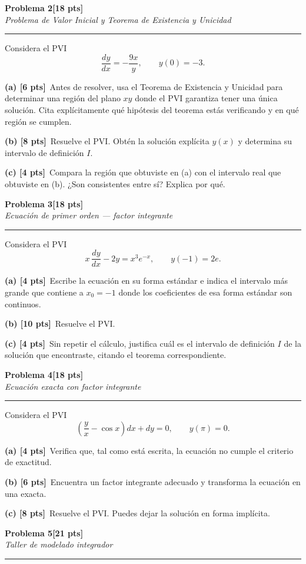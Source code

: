 \documentclass[11pt,letterpaper]{article}
\newcommand{\problema}[3]{%
  \bigskip\bigskip\noindent
  {\Large\textbf{Problema #1}}\hfill\textbf{[#2 pts]}\\[3pt]
  {\small\itshape #3}\par
  \vspace{2pt}\hrule\vspace{8pt}
}
\newcommand{\subparte}[2]{%
  \medskip\noindent\textbf{(#1}\ #2\par
}
\begin{document}
\problema{2}{18}{Problema de Valor Inicial y Teorema de Existencia y Unicidad}

Considera el PVI
\[
\frac{dy}{dx} = -\frac{9x}{y}, \qquad y(0) = -3.
\]

\subparte{a) [6 pts]}{Antes de resolver, usa el Teorema de Existencia y Unicidad para determinar una región del plano $xy$ donde el PVI garantiza tener una única solución. Cita explícitamente qué hipótesis del teorema estás verificando y en qué región se cumplen.}

\subparte{b) [8 pts]}{Resuelve el PVI. Obtén la solución explícita $y(x)$ y determina su intervalo de definición $I$.}

\subparte{c) [4 pts]}{Compara la región que obtuviste en (a) con el intervalo real que obtuviste en (b). ¿Son consistentes entre sí? Explica por qué.}


\problema{3}{18}{Ecuación de primer orden — factor integrante}

Considera el PVI
\[
x\,\frac{dy}{dx} - 2y = x^3 e^{-x}, \qquad y(-1) = 2e.
\]

\subparte{a) [4 pts]}{Escribe la ecuación en su forma estándar e indica el intervalo más grande que contiene a $x_0=-1$ donde los coeficientes de esa forma estándar son continuos.}

\subparte{b) [10 pts]}{Resuelve el PVI.}

\subparte{c) [4 pts]}{Sin repetir el cálculo, justifica cuál es el intervalo de definición $I$ de la solución que encontraste, citando el teorema correspondiente.}

\problema{4}{18}{Ecuación exacta con factor integrante}

Considera el PVI
\[
\left(\frac{y}{x} - \cos x\right) dx + dy = 0, \qquad y(\pi) = 0.
\]

\subparte{a) [4 pts]}{Verifica que, tal como está escrita, la ecuación no cumple el criterio de exactitud.}

\subparte{b) [6 pts]}{Encuentra un factor integrante adecuado y transforma la ecuación en una exacta.}

\subparte{c) [8 pts]}{Resuelve el PVI. Puedes dejar la solución en forma implícita.}


\problema{5}{21}{Taller de modelado integrador}
\end{document}

